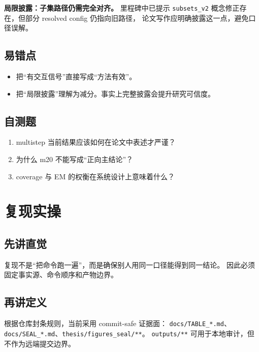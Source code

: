 \documentclass[UTF8,a4paper,12pt]{ctexart}
\begin{document}
\textbf{局限披露：子集路径仍需完全对齐。}
里程碑中已提示 \texttt{subsets\_v2} 概念修正存在，但部分 resolved config 仍指向旧路径，
论文写作应明确披露这一点，避免口径误解。

\subsection{易错点}
\begin{itemize}
  \item 把“有交互信号”直接写成“方法有效”。
  \item 把“局限披露”理解为减分。事实上完整披露会提升研究可信度。
\end{itemize}

\subsection{自测题}
\begin{enumerate}
  \item multistep 当前结果应该如何在论文中表述才严谨？
  \item 为什么 m20 不能写成“正向主结论”？
  \item coverage 与 EM 的权衡在系统设计上意味着什么？
\end{enumerate}

\section{复现实操}
\subsection{先讲直觉}
复现不是“把命令跑一遍”，而是确保别人用同一口径能得到同一结论。
因此必须固定事实源、命令顺序和产物边界。

\subsection{再讲定义}
根据仓库封条规则，当前采用 commit-safe 证据面：
\texttt{docs/TABLE\_*.md}、\texttt{docs/SEAL\_*.md}、\texttt{thesis/figures\_seal/**}。  
\texttt{outputs/**} 可用于本地审计，但不作为远端提交边界。
\end{document}
